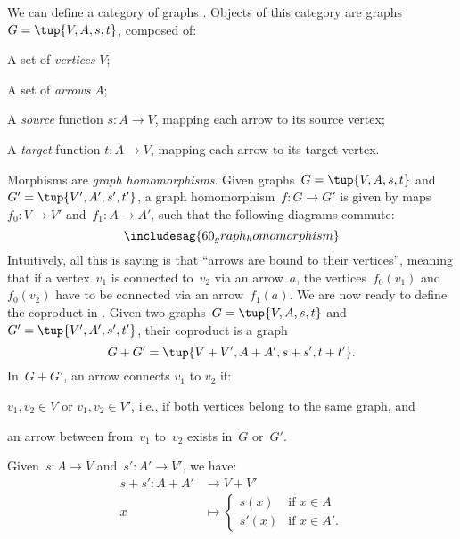 \begin{example}
We can define a category of graphs \Graph. Objects of this category are graphs~$G=\tup{V,A,s,t}$, composed of:
\begin{compactitem}
\item A set of \emph{vertices} $V$;
\item A set of \emph{arrows} $A$;
\item A \emph{source} function $s\colon A\to V$, mapping each arrow to its source vertex;
\item A \emph{target} function $t\colon A\to V$, mapping each arrow to its target vertex.
\end{compactitem}
Morphisms are \emph{graph homomorphisms}. Given graphs~$G=\tup{V,A,s,t}$ and~$G'=\tup{V',A',s',t'}$, a graph homomorphism~$f\colon G\to G'$ is given by maps~$f_0\colon V\to V'$ and~$f_1\colon A\to A'$, such that the following diagrams commute:
\begin{equation*}
\includesag{60_graph_homomorphism}
\end{equation*}
Intuitively, all this is saying is that ``arrows are bound to their vertices'', meaning that if a vertex~$v_1$ is connected to~$v_2$ via an arrow~$a$, the vertices~$f_0(v_1)$ and~$f_0(v_2)$ have to be connected via an arrow~$f_1(a)$. We are now ready to define the coproduct in \Graph. Given two graphs~$G=\tup{V,A,s,t}$ and~$G'=\tup{V',A',s',t'}$, their coproduct is a graph
        \begin{equation*}
            G+G'=\tup{V+V',A+A',s+s',t+t'}.
        \end{equation*}
In~$G+G'$, an arrow connects $v_1$ to $v_2$ if:
\begin{compactitem}
\item $v_1,v_2\in V$ or $v_1,v_2\in V'$, i.e., if both vertices belong to the same graph, and
\item an arrow between from~$v_1$ to~$v_2$ exists in~$G$ or~$G'$.
\end{compactitem}
Given~$s\colon A\to V$ and~$s'\colon A'\to V'$, we have:
\begin{equation*}
        \begin{aligned}
            s+ s'\colon A+ A'&\to V+ V'\\
            x&\mapsto
                \begin{cases}
                   s(x)& \text{if } x\in A\\
                    s'(x)&\text{if } x\in A'.
                    \end{cases}

\end{aligned}
\end{equation*}
\end{example}
